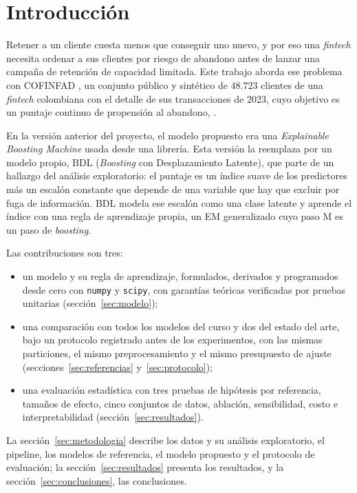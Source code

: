 \section{Introducción}\label{sec:introduccion}

Retener a un cliente cuesta menos que conseguir uno nuevo, y por eso una \emph{fintech} necesita ordenar a sus clientes
por riesgo de abandono antes de lanzar una campaña de retención de capacidad limitada. Este trabajo aborda ese problema
con COFINFAD \citep{munoz2025}, un conjunto público y sintético de $48.723$ clientes de una \emph{fintech} colombiana con
el detalle de sus transacciones de 2023, cuyo objetivo es un puntaje continuo de propensión al abandono, \cp.

En la versión anterior del proyecto, el modelo propuesto era una \emph{Explainable Boosting Machine} usada desde una
librería. Esta versión la reemplaza por un modelo propio, BDL (\emph{Boosting} con Desplazamiento Latente), que parte de
un hallazgo del análisis exploratorio: el puntaje es un índice suave de los predictores más un escalón constante que
depende de una variable que hay que excluir por fuga de información. BDL modela ese escalón como una clase latente y
aprende el índice con una regla de aprendizaje propia, un EM generalizado cuyo paso M es un paso de \emph{boosting}.

Las contribuciones son tres:
\begin{itemize}
  \item un modelo y su regla de aprendizaje, formulados, derivados y programados desde cero con \texttt{numpy} y
        \texttt{scipy}, con garantías teóricas verificadas por pruebas unitarias (sección~\ref{sec:modelo});
  \item una comparación con todos los modelos del curso y dos del estado del arte, bajo un protocolo registrado antes
        de los experimentos, con las mismas particiones, el mismo preprocesamiento y el mismo presupuesto de ajuste
        (secciones~\ref{sec:referencias} y~\ref{sec:protocolo});
  \item una evaluación estadística con tres pruebas de hipótesis por referencia, tamaños de efecto, cinco conjuntos de
        datos, ablación, sensibilidad, costo e interpretabilidad (sección~\ref{sec:resultados}).
\end{itemize}

La sección~\ref{sec:metodologia} describe los datos y su análisis exploratorio, el pipeline, los modelos de referencia,
el modelo propuesto y el protocolo de evaluación; la sección~\ref{sec:resultados} presenta los resultados, y la
sección~\ref{sec:conclusiones}, las conclusiones.
